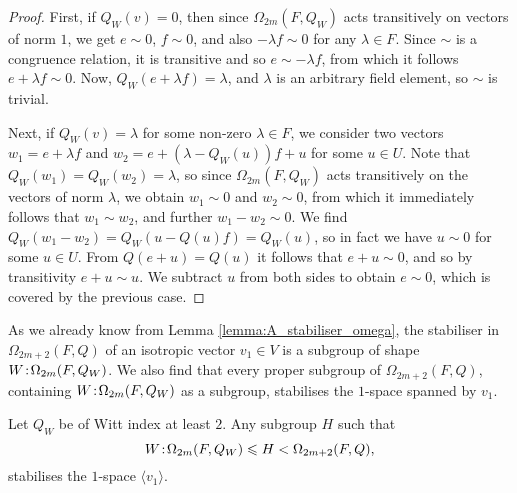 \begin{proof}
    First, if $Q_W(v) = 0$, then since $\Omega_{2m}(F,Q_W)$ acts transitively on vectors
    of norm $1$, we get $e \sim 0$, $f \sim 0$, and also $-\lambda f \sim 0$ for any 
    $\lambda \in F$. Since $\sim$ is a congruence relation, it is transitive and so
    $e \sim -\lambda f$, from which it follows $e + \lambda f \sim 0$. Now, 
    $Q_W(e + \lambda f) = \lambda$, and $\lambda$ is an arbitrary field element,
    so $\sim$ is trivial.
    
    Next, if $Q_W(v) = \lambda$ for some non-zero $\lambda \in F$, we consider two vectors
    $w_1 = e + \lambda f$ and $w_2 = e + (\lambda - Q_W(u))f + u$ for some $u \in U$. 
    Note that $Q_W(w_1) = Q_W(w_2) = \lambda$, so since $\Omega_{2m}(F,Q_W)$
    acts transitively on the vectors of norm $\lambda$, we obtain
    $w_1 \sim 0$ and $w_2 \sim 0$, from which it immediately follows that 
    $w_1 \sim w_2$, and further $w_1 - w_2 \sim 0$. 
    We find $Q_W(w_1 - w_2) = Q_W(u - Q(u)f) = Q_W(u)$, so in fact we have
    $u \sim 0$ for some $u \in U$. From $Q(e+u) = Q(u)$ it follows that 
    $e + u \sim 0$, and so by transitivity $e+u \sim u$. We subtract $u$ from both
    sides to obtain $e \sim 0$, which is covered by the previous case. 
\end{proof}

As we already know from Lemma \ref{lemma:A_stabiliser_omega}, the stabiliser in $\Omega_{2m+2}(F,Q)$
of an isotropic vector $v_1 \in V$ is a subgroup of shape $W\mathord{{\;\!{:}\;\!}}\Omega_{2m}(F,Q_W)$. We also find that
every proper 
subgroup of $\Omega_{2m+2}(F,Q)$, containing $W\mathord{{\;\!{:}\;\!}}\Omega_{2m}(F,Q_W)$ as a subgroup, stabilises 
the $1$-space spanned by $v_1$.

\begin{theorem}
	\label{theorem:A_space_stab}
	Let $Q_W$ be of Witt index at least $2$. Any subgroup $H$ such that
	\begin{equation}
		W\mathord{{\;\!{:}\;\!}}\Omega_{2m}(F,Q_W) \leqslant H < \Omega_{2m+2}(F,Q),
	\end{equation}
	stabilises the $1$-space $\langle v_1 \rangle$. 
\end{theorem}


